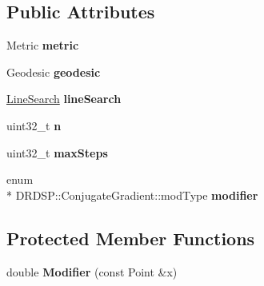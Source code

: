 \subsection*{Public Attributes}
\begin{DoxyCompactItemize}
\item 
\hypertarget{struct_d_r_d_s_p_1_1_conjugate_gradient_a1f7b00cedb7596ca2d5ddd9319970968}{Metric {\bfseries metric}}\label{struct_d_r_d_s_p_1_1_conjugate_gradient_a1f7b00cedb7596ca2d5ddd9319970968}

\item 
\hypertarget{struct_d_r_d_s_p_1_1_conjugate_gradient_a4d615b846d98b25b42595a9224984896}{Geodesic {\bfseries geodesic}}\label{struct_d_r_d_s_p_1_1_conjugate_gradient_a4d615b846d98b25b42595a9224984896}

\item 
\hypertarget{struct_d_r_d_s_p_1_1_conjugate_gradient_a63540dd317ba49a3cb74652e1843d468}{\hyperlink{struct_d_r_d_s_p_1_1_line_search}{Line\-Search} {\bfseries line\-Search}}\label{struct_d_r_d_s_p_1_1_conjugate_gradient_a63540dd317ba49a3cb74652e1843d468}

\item 
\hypertarget{struct_d_r_d_s_p_1_1_conjugate_gradient_a0fda11830e3613a899c21174c9bef987}{uint32\-\_\-t {\bfseries n}}\label{struct_d_r_d_s_p_1_1_conjugate_gradient_a0fda11830e3613a899c21174c9bef987}

\item 
\hypertarget{struct_d_r_d_s_p_1_1_conjugate_gradient_a3d17de4607acfbd7bf82986350730f83}{uint32\-\_\-t {\bfseries max\-Steps}}\label{struct_d_r_d_s_p_1_1_conjugate_gradient_a3d17de4607acfbd7bf82986350730f83}

\item 
\hypertarget{struct_d_r_d_s_p_1_1_conjugate_gradient_a0370bc97e78073a487af5067a0f4f16e}{enum \\*
D\-R\-D\-S\-P\-::\-Conjugate\-Gradient\-::mod\-Type {\bfseries modifier}}\label{struct_d_r_d_s_p_1_1_conjugate_gradient_a0370bc97e78073a487af5067a0f4f16e}

\end{DoxyCompactItemize}
\subsection*{Protected Member Functions}
\begin{DoxyCompactItemize}
\item 
\hypertarget{struct_d_r_d_s_p_1_1_conjugate_gradient_a68790da1a177ed56ce1db8a53f79e806}{double {\bfseries Modifier} (const Point \&x)}\label{struct_d_r_d_s_p_1_1_conjugate_gradient_a68790da1a177ed56ce1db8a53f79e806}

\end{DoxyCompactItemize}
